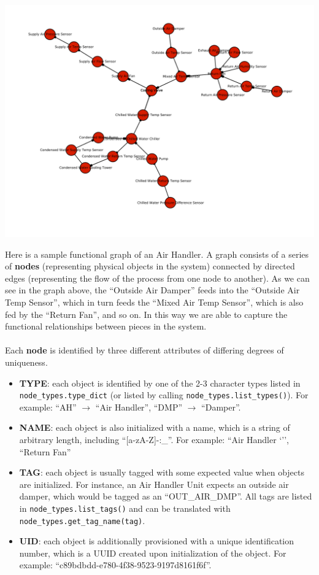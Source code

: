 \begin{center}
\includegraphics[scale=.8]{out.png}
\end{center}
Here is a sample functional graph of an Air Handler. A graph consists of a series of {\bf nodes} (representing physical objects in the system) connected by directed edges (representing the flow of the process from one node to another). As we can see in the graph above, the ``Outside Air Damper'' feeds into the ``Outside Air Temp Sensor'', which in turn feeds the ``Mixed Air Temp Sensor'', which is also fed by the ``Return Fan'', and so on. In this way we are able to capture the functional relationships between pieces in the system.
\\\\
Each {\bf node} is identified by three different attributes of differing degrees of uniqueness.
\begin{itemize}
	\item {\bf TYPE}: each object is identified by one of the 2-3 character types listed in \verb+node_types.type_dict+ (or listed by calling \verb+node_types.list_types()+). For example: ``AH'' $\rightarrow$ ``Air Handler'', ``DMP'' $\rightarrow$ ``Damper''.
	
	\item {\bf NAME}: each object is also initialized with a name, which is a string of arbitrary length, including ``[a-zA-Z]-:\_''. For example: ``Air Handler `'', ``Return Fan''
	
	\item {\bf TAG}: each object is usually tagged with some expected value when objects are initialized. For instance, an Air Handler Unit expects an outside air damper, which would be tagged as an ``OUT\_AIR\_DMP''. All tags are listed in \verb+node_types.list_tags()+ and can be translated with \verb+node_types.get_tag_name(tag)+.
	
	\item {\bf UID}: each object is additionally provisioned with a unique identification number, which is a UUID created upon initialization of the object. For example: ``c89bdbdd-e780-4f38-9523-9197d8161f6f''.
\end{itemize}

